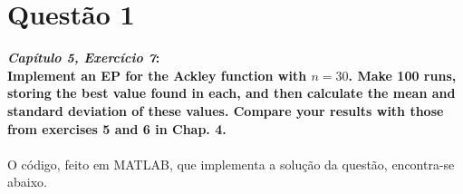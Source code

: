 \documentclass{report}
\begin{document}


\section*{Questão 1}

\textbf{\textit{Capítulo 5, Exercício 7}:}\\

\textbf{Implement an EP for the Ackley function with $n = 30$. Make 100 runs, storing the best value found in each, and then calculate the mean and standard deviation of these values. Compare your results with those from exercises 5 and 6 in Chap. 4.}\\

\paragraph{} O código, feito em MATLAB, que implementa a solução da questão, encontra-se abaixo.\\
\end{document}
